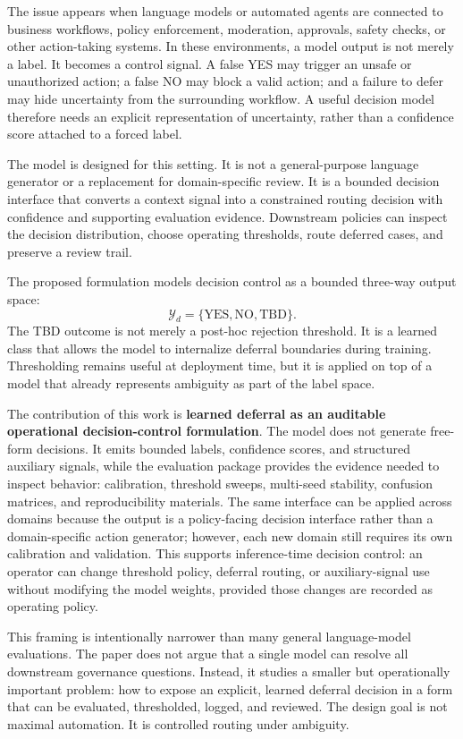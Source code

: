 \documentclass[11pt]{article}
\begin{document}
The issue appears when language models or automated agents are connected to business workflows, policy enforcement, moderation, approvals, safety checks, or other action-taking systems. In these environments, a model output is not merely a label. It becomes a control signal. A false YES may trigger an unsafe or unauthorized action; a false NO may block a valid action; and a failure to defer may hide uncertainty from the surrounding workflow. A useful decision model therefore needs an explicit representation of uncertainty, rather than a confidence score attached to a forced label.

The model is designed for this setting. It is not a general-purpose language generator or a replacement for domain-specific review. It is a bounded decision interface that converts a context signal into a constrained routing decision with confidence and supporting evaluation evidence. Downstream policies can inspect the decision distribution, choose operating thresholds, route deferred cases, and preserve a review trail.

The proposed formulation models decision control as a bounded three-way output space:
\[
\mathcal{Y}_d = \{\text{YES}, \text{NO}, \text{TBD}\}.
\]
The TBD outcome is not merely a post-hoc rejection threshold. It is a learned class that allows the model to internalize deferral boundaries during training. Thresholding remains useful at deployment time, but it is applied on top of a model that already represents ambiguity as part of the label space.

The contribution of this work is \textbf{learned deferral as an auditable operational decision-control formulation}. The model does not generate free-form decisions. It emits bounded labels, confidence scores, and structured auxiliary signals, while the evaluation package provides the evidence needed to inspect behavior: calibration, threshold sweeps, multi-seed stability, confusion matrices, and reproducibility materials. The same interface can be applied across domains because the output is a policy-facing decision interface rather than a domain-specific action generator; however, each new domain still requires its own calibration and validation. This supports inference-time decision control: an operator can change threshold policy, deferral routing, or auxiliary-signal use without modifying the model weights, provided those changes are recorded as operating policy.

This framing is intentionally narrower than many general language-model evaluations. The paper does not argue that a single model can resolve all downstream governance questions. Instead, it studies a smaller but operationally important problem: how to expose an explicit, learned deferral decision in a form that can be evaluated, thresholded, logged, and reviewed. The design goal is not maximal automation. It is controlled routing under ambiguity.
\end{document}
